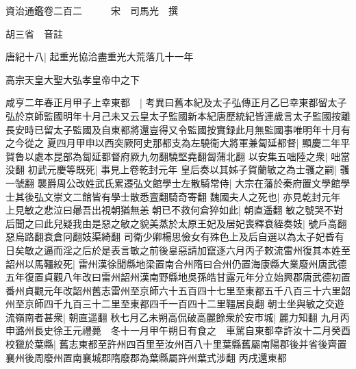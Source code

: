 資治通鑑卷二百二　　　宋　司馬光　撰

胡三省　音註

唐紀十八|{
	起重光協洽盡重光大荒落几十一年}


高宗天皇大聖大弘孝皇帝中之下

咸亨二年春正月甲子上幸東都　|{
	考異曰舊本紀及太子弘傳正月乙巳幸東都留太子弘於京師監國明年十月己未又云皇太子監國新本紀唐歷統紀皆連歲言太子監國按離長安時已留太子監國及自東都將還豈得又令監國按實録此月無監國事唯明年十月有之今從之}
夏四月甲申以西突厥阿史那都支為左驍衛大將軍兼匐延都督|{
	顯慶二年平賀魯以處本昆部為匐延都督府厥九勿翻驍堅堯翻匐蒲北翻}
以安集五咄陸之衆|{
	咄當没翻}
初武元慶等既死|{
	事見上卷乾封元年}
皇后奏以其姊子賀蘭敏之為士彠之嗣|{
	彠一虢翻}
襲爵周公改姓武氏累遷弘文館學士左散騎常侍|{
	大宗在藩於秦府置文學館學士其後弘文崇文二館皆有學士散悉亶翻騎奇寄翻}
魏國夫人之死也|{
	亦見乾封元年}
上見敏之悲泣曰曏吾出視朝猶無恙朝已不救何倉猝如此|{
	朝直遥翻}
敏之號哭不對后聞之曰此兒疑我由是惡之敏之貌美蒸於太原王妃及居妃喪釋衰絰奏妓|{
	號戶高翻惡烏路翻衰倉冋翻妓渠綺翻}
司衛少卿楊思儉女有殊色上及后自選以為太子妃昏有日矣敏之逼而淫之后於是表言敏之前後辠惡請加竄逐六月丙子敕流雷州復其本姓至韶州以馬韁絞死|{
	雷州漢徐聞縣地梁置南合州隋曰合州仍置海康縣大業廢州唐武德五年復置貞觀八年改曰雷州韶州漢南野縣地吳孫皓甘露元年分立始興郡唐武德初置番州貞觀元年改韶州舊志雷州至京師六十五百四十七里至東都五千八百三十六里韶州至京師四千九百三十二里至東都四千一百四十二里韁居良翻}
朝士坐與敏之交遊流嶺南者甚衆|{
	朝直遥翻}
秋七月乙未朔高侃破高麗餘衆於安市城|{
	麗力知翻}
九月丙申潞州長史徐王元禮薨　冬十一月甲午朔日有食之　車駕自東都幸許汝十二月癸酉校獵於葉縣|{
	舊志東都至許州四百里至汝州百八十里葉縣舊屬南陽郡後并省後齊置襄州後周廢州置南襄城郡隋廢郡為葉縣屬許州葉式涉翻}
丙戌還東都

